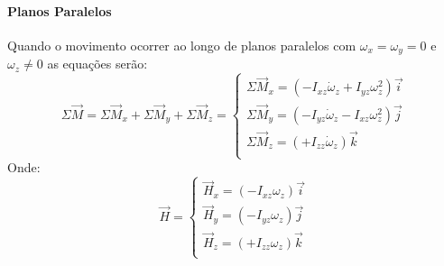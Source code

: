 \documentclass{article}
\begin{document}
            \paragraph{Planos Paralelos}Quando o movimento ocorrer ao longo de planos paralelos com $\omega_{x} = \omega_{y} = 0$ e $\omega_{z} \ne 0$ as equações serão:
                \begin{equation}
                    \boxed{
                        \Sigma\vec{M} = 
                        \Sigma\vec{M}_{x} + 
                        \Sigma\vec{M}_{y} + 
                        \Sigma\vec{M}_{z} = 
                        \begin{cases}
                            \Sigma\vec{M}_{x} = (- I_{xz}\dot{\omega}_{z} + I_{yz}\omega_{z}^{2})\vec{i}\\
                            \Sigma\vec{M}_{y} = (- I_{yz}\dot{\omega}_{z} - I_{xz}\omega_{z}^{2})\vec{j}\\
                            \Sigma\vec{M}_{z} = (+ I_{zz}\dot{\omega}_{z})\vec{k}\\
                        \end{cases}
                    }
                \end{equation}
            Onde:
                \begin{equation}
                    \boxed{
                        \vec{H} = 
                        \begin{cases}
                            \vec{H}_{x} = (- I_{xz}\omega_{z})\vec{i}\\
                            \vec{H}_{y} = (- I_{yz}\omega_{z})\vec{j}\\
                            \vec{H}_{z} = (+ I_{zz}\omega_{z})\vec{k}\\
                        \end{cases}
                    }
                \end{equation}
\end{document}
